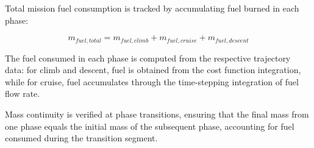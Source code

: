 
Total mission fuel consumption is tracked by accumulating fuel burned in each phase:

\begin{equation}
m_{fuel,total} = m_{fuel,climb} + m_{fuel,cruise} + m_{fuel,descent}
\end{equation}

The fuel consumed in each phase is computed from the respective trajectory data: for climb and descent, fuel is obtained from the cost function integration, while for cruise, fuel accumulates through the time-stepping integration of fuel flow rate.

Mass continuity is verified at phase transitions, ensuring that the final mass from one phase equals the initial mass of the subsequent phase, accounting for fuel consumed during the transition segment.
